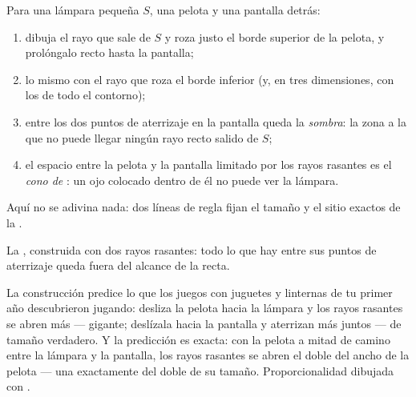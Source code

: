 \begin{method}\label{met:g6:light-propagation:shadow}
Para una lámpara pequeña $S$, una pelota y una pantalla detrás:
\begin{enumerate}
  \item dibuja el rayo que sale de $S$ y roza justo el borde
        superior de la pelota, y prolóngalo recto hasta la pantalla;
  \item {} lo mismo con el rayo que roza el borde inferior (y, en
        tres dimensiones, con los de todo el contorno);
  \item entre los dos puntos de aterrizaje en la pantalla queda la
        \emph{sombra}: la zona a la que no puede llegar
        ningún rayo recto salido de $S$;
  \item el espacio entre la pelota y la pantalla limitado por los
        rayos rasantes es el \emph{cono de }: un ojo
        colocado dentro de él no puede ver la lámpara.
\end{enumerate}
Aquí no se adivina nada: dos líneas de regla fijan el tamaño y el
sitio exactos de la .
\end{method}

\begin{omfigure}

{\small La , construida con dos rayos rasantes: todo lo que hay
entre sus puntos de aterrizaje queda fuera del alcance de la 
recta.}
\end{omfigure}

\begin{example}\label{ex:g6:light-propagation:sizes}
La construcción predice lo que los juegos con juguetes y linternas de
tu primer año descubrieron jugando: desliza la pelota hacia la lámpara
y los rayos rasantes se abren más ---  gigante; deslízala
hacia la pantalla y aterrizan más juntos ---  de tamaño
verdadero. Y la predicción es exacta: con la pelota a mitad de camino
entre la lámpara y la pantalla, los rayos rasantes se abren el doble
del ancho de la pelota --- una  exactamente del doble de su
tamaño. Proporcionalidad dibujada con .
\end{example}


